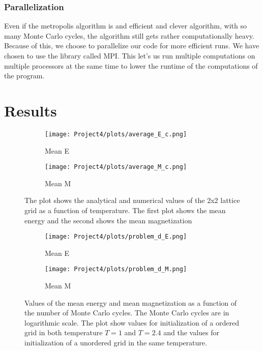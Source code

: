 \documentclass{article}
\begin{document}
\subsubsection{Parallelization}
Even if the metropolis algorithm is and efficient and clever algorithm, with so many Monte Carlo cycles, the algorithm still gets rather computationally heavy. Because of this, we choose to parallelize our code for more efficient runs. We have chosen to use the library called MPI. This let's us run multiple computations on multiple processors at the same time to lower the runtime of the computations of the program.

\newpage
\section{Results}

\begin{figure}[H]
  \begin{subfigure}[b]{0.6\textwidth}
    \texttt{[image: Project4/plots/average\_E\_c.png]}
    \caption{Mean E}
    \label{fig:meanEA}
  \end{subfigure}
  \hfill
  \begin{subfigure}[b]{0.6\textwidth}
    \texttt{[image: Project4/plots/average\_M\_c.png]}
    \caption{Mean M}
    \label{fig:meanMA}
  \end{subfigure}
  \caption{The plot shows the analytical and numerical values of the 2x2 lattice grid as a function of temperature. The first plot shows the mean energy and the second shows the mean magnetization}
\end{figure}

\begin{figure}[H]
  \begin{subfigure}[b]{0.6\textwidth}
    \texttt{[image: Project4/plots/problem\_d\_E.png]}
    \caption{Mean E}
    \label{fig:MCE}
  \end{subfigure}
  \hfill
  \begin{subfigure}[b]{0.6\textwidth}
    \texttt{[image: Project4/plots/problem\_d\_M.png]}
    \caption{Mean M}
    \label{fig:MCM}
  \end{subfigure}
  \caption{Values of the mean energy and mean magnetization as a function of the number of Monte Carlo cycles. The Monte Carlo cycles are in logarithmic scale. The plot show values for initialization of a ordered grid in both temperature $T=1$ and $T=2.4$ and the values for initialization of a unordered grid in the same temperature.}
\end{figure}
\end{document}
